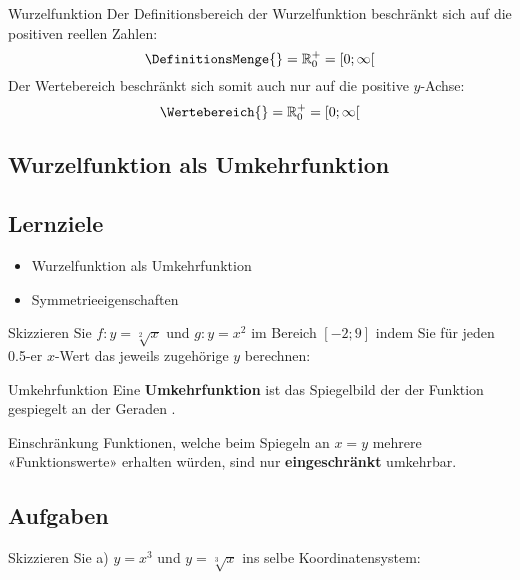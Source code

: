 \begin{definition}{Wurzelfunktion}{}
  Der Definitionsbereich der Wurzelfunktion beschränkt sich auf die
  positiven reellen Zahlen:
  $$\DefinitionsMenge{} = \mathbb{R}_0^{+} = [0;\infty[$$
      Der Wertebereich beschränkt sich somit auch nur auf die positive $y$-Achse:
  $$\Wertebereich{} = \mathbb{R}_0^{+} = [0;\infty[$$
      
\end{definition}
\newpage

\subsection{Wurzelfunktion als Umkehrfunktion}

\subsection*{Lernziele}

\begin{itemize}
\item Wurzelfunktion als Umkehrfunktion
\item Symmetrieeigenschaften
\end{itemize}

\newpage

Skizzieren Sie $f: y = \sqrt[2]{x}$ und $g: y=x^2$ im Bereich $[-2; 9]$ indem Sie für jeden 0.5-er $x$-Wert das jeweils zugehörige $y$ berechnen:


\begin{bemerkung}{Umkehrfunktion}{}
  Eine \textbf{Umkehrfunktion} ist das Spiegelbild der der Funktion
  gespiegelt an der Geraden .
\end{bemerkung}  

\begin{bemerkung}{Einschränkung}{}
Funktionen, welche beim Spiegeln an $x=y$ mehrere «Funktionswerte»
erhalten würden, sind nur \textbf{eingeschränkt} umkehrbar.
\end{bemerkung}

\newpage
\subsection*{Aufgaben}
Skizzieren Sie
a) $y=x^3$ und $y=\sqrt[3]{x}$ ins selbe Koordinatensystem:

